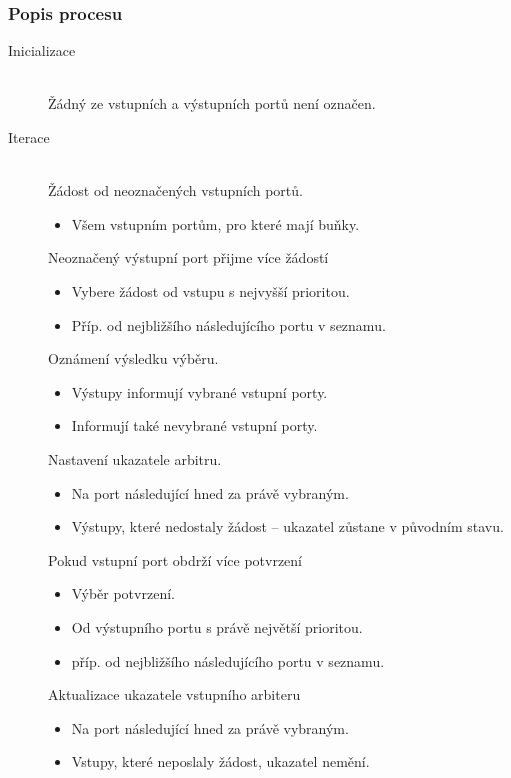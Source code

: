 \subsubsection{Popis procesu}
\begin{description}
  \item[Inicializace] \hfill \\
  Žádný ze vstupních a výstupních portů není označen.\par
  \item[Iterace] \hfill \\
  Žádost od neoznačených vstupních portů.
  \begin{itemize}
      \item Všem vstupním portům, pro které mají buňky.\par
  \end{itemize}
  Neoznačený výstupní port přijme více žádostí
  \begin{itemize}
      \item Vybere žádost od vstupu s nejvyšší prioritou.\par
      \item Příp. od nejbližšího následujícího portu v seznamu. \par
  \end{itemize}
  Oznámení výsledku výběru.
 \begin{itemize}
    \item Výstupy informují vybrané vstupní porty. \par
    \item Informují také nevybrané vstupní porty. \par
  \end{itemize}        
  Nastavení ukazatele arbitru.
  \begin{itemize}
    \item Na port následující hned za právě vybraným. \par
    \item Výstupy, které nedostaly žádost -- ukazatel zůstane v původním stavu. \par
  \end{itemize}
  Pokud vstupní port obdrží více potvrzení
  \begin{itemize}
      \item Výběr potvrzení. \par
      \item Od výstupního portu s právě největší prioritou. \par
      \item příp. od nejbližšího následujícího portu v seznamu. \par
  \end{itemize}
  Aktualizace ukazatele vstupního arbiteru
  \begin{itemize}
      \item Na port následující hned za právě vybraným. \par
      \item Vstupy, které neposlaly žádost, ukazatel nemění. \par
  \end{itemize}
\end{description}
